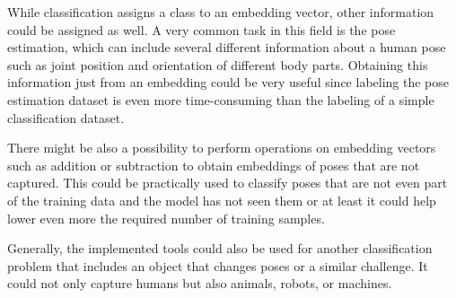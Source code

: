 While classification assigns a class to an embedding vector, other information could be assigned as well. A very common task in this field is the pose estimation, which can include several different information about a human pose such as joint position and orientation of different body parts. Obtaining this information just from an embedding could be very useful since labeling the pose estimation dataset is even more time-consuming than the labeling of a simple classification dataset.

There might be also a possibility to perform operations on embedding vectors such as addition or subtraction to obtain embeddings of poses that are not captured. This could be practically used to classify poses that are not even part of the training data and the model has not seen them or at least it could help lower even more the required number of training samples.

Generally, the implemented tools could also be used for another classification problem that includes an object that changes poses or a similar challenge. It could not only capture humans but also animals, robots, or machines.
